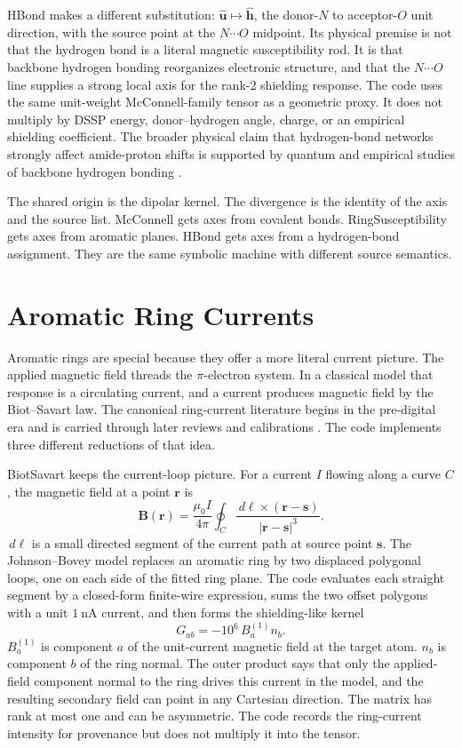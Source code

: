 \documentclass[11pt]{article}
\newcommand{\dd}{\,d}
\begin{document}
HBond makes a different substitution:
\(\hat{\bm u}\mapsto\hat{\bm h}\), the donor-\(N\) to acceptor-\(O\) unit
direction, with the source point at the \(N\cdots O\) midpoint. Its physical
premise is not that the hydrogen bond is a literal magnetic susceptibility
rod. It is that backbone hydrogen bonding reorganizes electronic structure, and
that the \(N\cdots O\) line supplies a strong local axis for the rank-2
shielding response. The code uses the same unit-weight McConnell-family tensor
as a geometric proxy. It does not multiply by DSSP energy, donor--hydrogen
angle, charge, or an empirical shielding coefficient. The broader physical
claim that hydrogen-bond networks strongly affect amide-proton shifts is
supported by quantum and empirical studies of backbone hydrogen bonding
\cite{parker2006,larsen2015}.

The shared origin is the dipolar kernel. The divergence is the identity of the
axis and the source list. McConnell gets axes from covalent bonds.
RingSusceptibility gets axes from aromatic planes. HBond gets axes from a
hydrogen-bond assignment. They are the same symbolic machine with different
source semantics.

\section{Aromatic Ring Currents}

Aromatic rings are special because they offer a more literal current picture.
The applied magnetic field threads the \(\pi\)-electron system. In a classical
model that response is a circulating current, and a current produces magnetic
field by the Biot--Savart law. The canonical ring-current literature begins in
the pre-digital era and is carried through later reviews and calibrations
\cite{pople1956,johnson1958,haigh1979,case1995,boyd2002}. The code implements
three different reductions of that idea.

BiotSavart keeps the current-loop picture. For a current \(I\) flowing along a
curve \(C\), the magnetic field at a point \(\bm r\) is
\[
  \bm B(\bm r)
  =
  \frac{\mu_0 I}{4\pi}
  \oint_C
  \frac{\dd\bm\ell\times(\bm r-\bm s)}
       {|\bm r-\bm s|^3}.
\]
\(\dd\bm\ell\) is a small directed segment of the current path at source point
\(\bm s\). The Johnson--Bovey model replaces an aromatic ring by two displaced
polygonal loops, one on each side of the fitted ring plane. The code evaluates
each straight segment by a closed-form finite-wire expression, sums the two
offset polygons with a unit \(\SI{1}{\nano\ampere}\) current, and then forms
the shielding-like kernel
\[
  G_{ab}=-10^6\,B^{(1)}_a n_b .
\]
\(B^{(1)}_a\) is component \(a\) of the unit-current magnetic field at the
target atom. \(n_b\) is component \(b\) of the ring normal. The outer product
says that only the applied-field component normal to the ring drives this
current in the model, and the resulting secondary field can point in any
Cartesian direction. The matrix has rank at most one and can be asymmetric.
The code records the ring-current intensity for provenance but does not multiply
it into the tensor.
\end{document}
